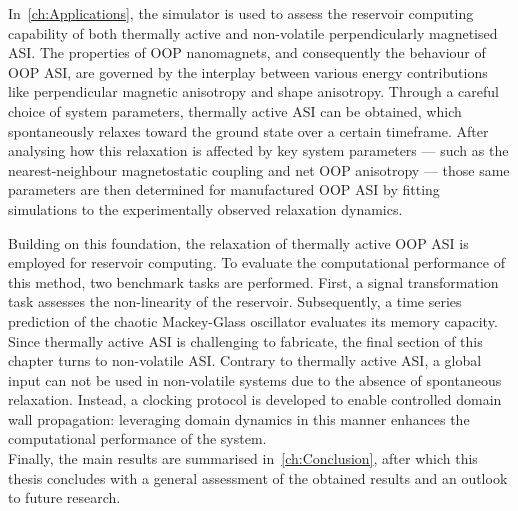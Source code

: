 In~\cref{ch:Applications}, the \hotspice simulator is used to assess the reservoir computing capability of both thermally active and non-volatile perpendicularly magnetised ASI.
The properties of OOP nanomagnets, and consequently the behaviour of OOP ASI, are governed by the interplay between various energy contributions like perpendicular magnetic anisotropy and shape anisotropy.
Through a careful choice of system parameters, thermally active ASI can be obtained, which spontaneously relaxes toward the ground state over a certain timeframe.
After analysing how this relaxation is affected by key system parameters --- such as the nearest-neighbour magnetostatic coupling and net OOP anisotropy --- those same parameters are then determined for manufactured OOP ASI by fitting simulations to the experimentally observed relaxation dynamics. \par
Building on this foundation, the relaxation of thermally active OOP ASI is employed for reservoir computing.
To evaluate the computational performance of this method, two benchmark tasks are performed.
First, a signal transformation task assesses the non-linearity of the reservoir.
Subsequently, a time series prediction of the chaotic Mackey-Glass oscillator evaluates its memory capacity.
Since thermally active ASI is challenging to fabricate, the final section of this chapter turns to non-volatile ASI.
Contrary to thermally active ASI, a global input can not be used in non-volatile systems due to the absence of spontaneous relaxation.
Instead, a clocking protocol is developed to enable controlled domain wall propagation: leveraging domain dynamics in this manner enhances the computational performance of the system. \\

Finally, the main results are summarised in~\cref{ch:Conclusion}, after which this thesis concludes with a general assessment of the obtained results and an outlook to future research. %
